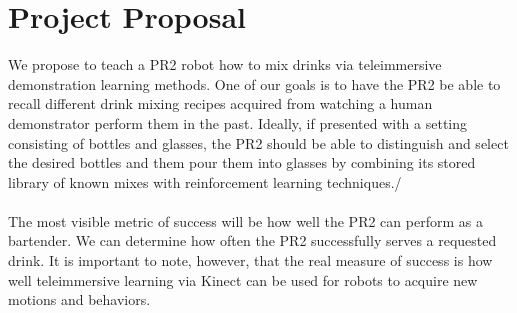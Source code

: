\documentclass{sig-alternate}
\begin{document}
\section{Project Proposal}
\label{sec:project_proposal}We propose to teach a PR2 robot how to mix drinks via
teleimmersive demonstration learning methods. One of our goals is to have the PR2
be able to recall different drink mixing recipes acquired from watching
a human demonstrator perform them in the past. Ideally, if presented
with a setting consisting of bottles and glasses, the PR2 should be able to 
distinguish and select the desired bottles and them pour them into glasses by
combining its stored library of known mixes with reinforcement learning techniques./
\\
\\The most visible metric of success will be  how well the PR2
can perform as a bartender. We can determine how often the PR2
successfully serves a requested drink. It is important to note, however, that the real
measure of success is how well teleimmersive learning via Kinect can be used
for robots to acquire new motions and behaviors.
\end{document}
